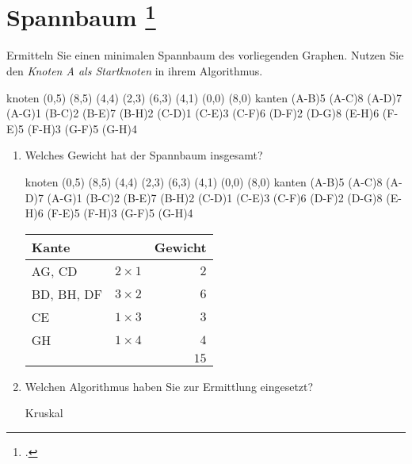 \documentclass{lehramt-informatik-aufgabe}
\begin{document}

\section{Spannbaum
\footcite[Aufgabe 6]{aud:e-klausur}}

Ermitteln Sie einen minimalen Spannbaum des vorliegenden Graphen. Nutzen
Sie den \emph{Knoten A als Startknoten} in ihrem Algorithmus.

\graph knoten {
  (0,5)
  (8,5)
  (4,4)
  (2,3)
  (6,3)
  (4,1)
  (0,0)
  (8,0)
} kanten {
  \kante(A-B){5}
  \kante(A-C){8}
  \kante(A-D){7}
  \kante(A-G){1}
  \kante(B-C){2}
  \kante(B-E){7}
  \kante(B-H){2}
  \kante(C-D){1}
  \kante(C-E){3}
  \kante(C-F){6}
  \kante(D-F){2}
  \kante(D-G){8}
  \kante(E-H){6}
  \kante(F-E){5}
  \kante(F-H){3}
  \kante(G-F){5}
  \kante(G-H){4}
}

\begin{enumerate}
\item Welches Gewicht hat der Spannbaum insgesamt?

\begin{antwort}
\graph knoten {
  (0,5)
  (8,5)
  (4,4)
  (2,3)
  (6,3)
  (4,1)
  (0,0)
  (8,0)
} kanten {
  \kante(A-B){5}
  \kante(A-C){8}
  \kante(A-D){7}
  \KANTE(A-G){1}
  \KANTE(B-C){2}
  \kante(B-E){7}
  \KANTE(B-H){2}
  \KANTE(C-D){1}
  \KANTE(C-E){3}
  \kante(C-F){6}
  \KANTE(D-F){2}
  \kante(D-G){8}
  \kante(E-H){6}
  \kante(F-E){5}
  \kante(F-H){3}
  \kante(G-F){5}
  \KANTE(G-H){4}
}

\begin{center}
\begin{tabular}{|l|l|r|}
\hline
Kante & & Gewicht\\\hline\hline
AG, CD     & $2 \times 1$ & $2$\\
BD, BH, DF & $3 \times 2$ & $6$\\
CE         & $1 \times 3$ & $3$\\
GH         & $1 \times 4$ & $4$\\\hline
           &              & $15$\\\hline
\end{tabular}
\end{center}
\end{antwort}

\item Welchen Algorithmus haben Sie zur Ermittlung eingesetzt?
\begin{antwort}
Kruskal
\end{antwort}
\end{enumerate}
\end{document}
